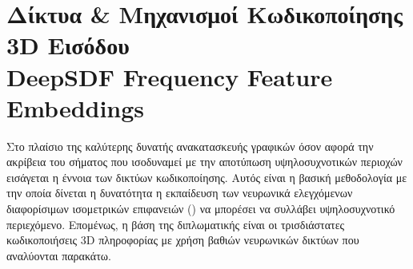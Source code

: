 \section{Δίκτυα \& Μηχανισμοί Κωδικοποίησης 3D Εισόδου \\ DeepSDF Frequency Feature Embeddings}
\label{section:dnnEmbeddings}
Στο πλαίσιο της καλύτερης δυνατής ανακατασκευής  γραφικών όσον αφορά την ακρίβεια του σήματος που ισοδυναμεί με την αποτύπωση
υψηλοσυχνοτικών περιοχών  εισάγεται η έννοια των δικτύων κωδικοποίησης. Αυτός είναι η βασική μεθοδολογία με την οποία δίνεται η δυνατότητα η εκπαίδευση των νευρωνικά ελεγχόμενων διαφορίσιμων ισομετρικών επιφανειών () να μπορέσει να συλλάβει υψηλοσυχνοτικό περιεχόμενο.  Επομένως, η βάση της διπλωματικής είναι οι τρισδιάστατες κωδικοποιήσεις 3D πληροφορίας με χρήση βαθιών νευρωνικών δικτύων που αναλύονται παρακάτω. 

